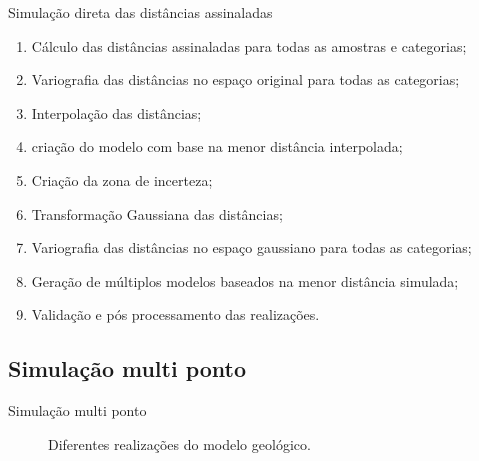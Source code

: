 \documentclass[aspectratio=169]{beamer}
\begin{document}
\begin{frame}{Simulação direta das distâncias assinaladas}
	\begin{enumerate}
		\item Cálculo das distâncias assinaladas para todas as amostras e categorias;
		\item Variografia das distâncias no espaço original para todas as categorias;
		\item Interpolação das distâncias; 
		\item criação do modelo com base na menor distância interpolada;
		\item Criação da zona de incerteza;
		\item Transformação Gaussiana das distâncias;
		\item Variografia das distâncias no espaço gaussiano para todas as categorias;
		\item Geração de múltiplos modelos baseados na menor distância simulada;
		\item Validação e pós processamento das realizações.
	\end{enumerate}
\end{frame}

\subsection{Simulação multi ponto}

\begin{frame}{Simulação multi ponto}
	\begin{figure}[H]
		\caption{Diferentes realizações do modelo geológico.} 
		\label{snesim_real}
	\end{figure}
\end{frame}
\end{document}
